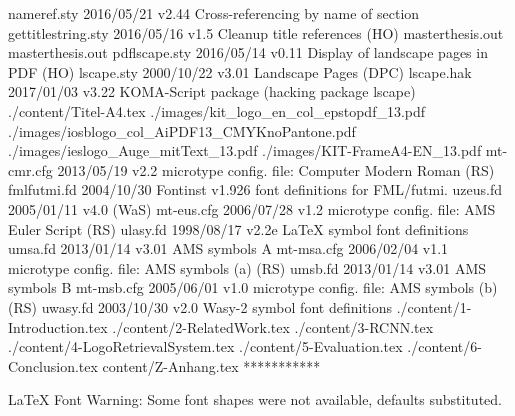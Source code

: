  nameref.sty    2016/05/21 v2.44 Cross-referencing by name of section
gettitlestring.sty    2016/05/16 v1.5 Cleanup title references (HO)
masterthesis.out
masterthesis.out
pdflscape.sty    2016/05/14 v0.11 Display of landscape pages in PDF (HO)
  lscape.sty    2000/10/22 v3.01 Landscape Pages (DPC)
  lscape.hak    2017/01/03 v3.22 KOMA-Script package (hacking package lscape)
./content/Titel-A4.tex
./images/kit_logo_en_col_epstopdf_13.pdf
./images/iosblogo_col_AiPDF13_CMYKnoPantone.pdf
./images/ieslogo_Auge_mitText_13.pdf
./images/KIT-FrameA4-EN_13.pdf
  mt-cmr.cfg    2013/05/19 v2.2 microtype config. file: Computer Modern Roman (RS)
fmlfutmi.fd    2004/10/30 Fontinst v1.926 font definitions for FML/futmi.
   uzeus.fd    2005/01/11 v4.0 (WaS)
  mt-eus.cfg    2006/07/28 v1.2 microtype config. file: AMS Euler Script (RS)
   ulasy.fd    1998/08/17 v2.2e LaTeX symbol font definitions
    umsa.fd    2013/01/14 v3.01 AMS symbols A
  mt-msa.cfg    2006/02/04 v1.1 microtype config. file: AMS symbols (a) (RS)
    umsb.fd    2013/01/14 v3.01 AMS symbols B
  mt-msb.cfg    2005/06/01 v1.0 microtype config. file: AMS symbols (b) (RS)
   uwasy.fd    2003/10/30 v2.0 Wasy-2 symbol font definitions
./content/1-Introduction.tex
./content/2-RelatedWork.tex
./content/3-RCNN.tex
./content/4-LogoRetrievalSystem.tex
./content/5-Evaluation.tex
./content/6-Conclusion.tex
content/Z-Anhang.tex
 ***********


LaTeX Font Warning: Some font shapes were not available, defaults substituted.

